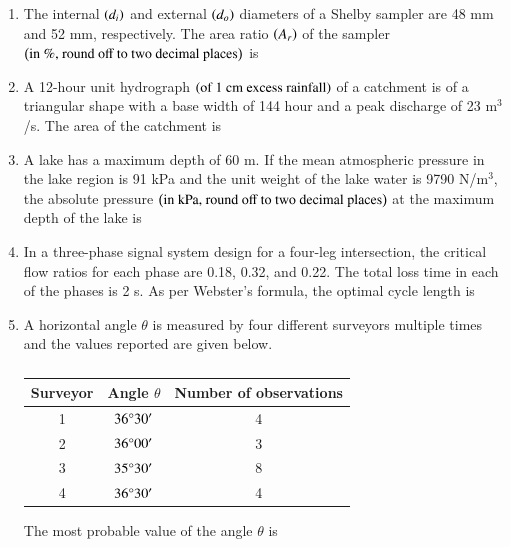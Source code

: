 \documentclass[journal,12pt,onecolumn]{article}
\theoremstyle{remark}
\begin{document}
\begin{enumerate}
\hfill{}

\item The internal $\left(d_i\right)$ and external $\left(d_o\right)$ diameters of a Shelby sampler are 48 mm and 52 mm, respectively. The area ratio $\left(A_r\right)$ of the sampler $\left(\text{in \%, round off to two decimal places}\right)$ is \underline{\hspace{2cm}}

\hfill{}

\item A 12-hour unit hydrograph $\left(\text{of 1 cm excess rainfall}\right)$ of a catchment is of a triangular shape with a base width of 144 hour and a peak discharge of 23 m$^3$/s. The area of the catchment  is \underline{\hspace{2cm}}

\hfill{}

\item A lake has a maximum depth of 60 m. If the mean atmospheric pressure in the lake region is 91 kPa and the unit weight of the lake water is 9790 N/m$^3$, the absolute pressure $\left(\text{in kPa, round off to two decimal places}\right)$ at the maximum depth of the lake is \underline{\hspace{2cm}}

\hfill{}

\item In a three-phase signal system design for a four-leg intersection, the critical flow ratios for each phase are 0.18, 0.32, and 0.22. The total loss time in each of the phases is 2 s. As per Webster's formula, the optimal cycle length  is \underline{\hspace{2cm}}

\hfill{}

\item A horizontal angle $\theta$ is measured by four different surveyors multiple times and the values reported are given below.
\begin{table}[H]
    \centering
    \begin{tabular}{|c|c|c|}
        \hline
        \textbf{Surveyor} & \textbf{Angle $\theta$} & \textbf{Number of observations} \\ \hline
        1 & $36\degree30'$ & 4 \\ \hline
        2 & $36\degree00'$ & 3 \\ \hline
        3 & $35\degree30'$ & 8 \\ \hline
        4 & $36\degree30'$ & 4 \\ \hline
    \end{tabular}
    \caption{}
    \label{tab:q25}
\end{table}
The most probable value of the angle $\theta$  is \underline{\hspace{2cm}}


\end{enumerate}
\end{document}
